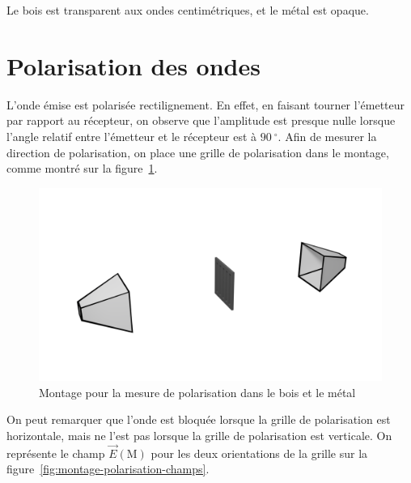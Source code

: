 \documentclass[a4paper,twocolumn,10pt,margin=0.5in]{extreport}
\begin{document}
	Le bois est transparent aux ondes centimétriques, et le métal est opaque.

	\bigskip

	\section{Polarisation des ondes}

	L'onde émise est polarisée rectilignement. En effet, en faisant tourner l'émetteur par rapport au récepteur, on observe que l'amplitude est presque nulle lorsque l'angle relatif entre l'émetteur et le récepteur est à $90\:^\circ$.
	Afin de mesurer la direction de polarisation, on place une grille de polarisation dans le montage, comme montré sur la figure~\ref{fig:montage-polarisation}.

	\begin{figure}[H]
		\centering
		\vspace{-1cm}
		\includegraphics[width=\linewidth]{figures/montage-2.png}
		\vspace{-1cm}
		\caption{Montage pour la mesure de polarisation dans le bois et le métal}
		\label{fig:montage-polarisation}
	\end{figure}

	On peut remarquer que l'onde est bloquée lorsque la grille de polarisation est horizontale, mais ne l'est pas lorsque la grille de polarisation est verticale.
	On représente le champ $\vec{E}(\mathrm{M})$ pour les deux orientations de la grille sur la figure~\ref{fig:montage-polarisation-champs}.
\end{document}
